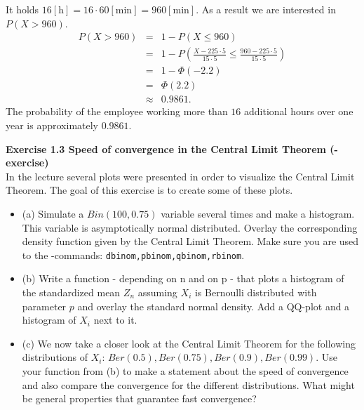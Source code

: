 \documentclass[11pt]{article}
\newcommand{\bi}{\begin{itemize}}
\newcommand{\ei}{\end{itemize}}
\newenvironment{loesung}{}{}          %
\begin{document}
\begin{enumerate}
\begin{loesung}\vspace{0.2cm}
It holds $16 [\text{h}] = 16 \cdot 60 [\text{min}] = 960 [\text{min}]$. As a result we are interested in $P(X > 960)$. 
\begin{eqnarray*}
  P(X > 960) &=& 1 - P(X \leq 960)\\
             &=& 1 - P\left(\frac{X - 225 \cdot 5}{15 \cdot 5} \leq \frac{960 - 225 \cdot 5}{15 \cdot 5} \right) \\
             &=& 1 - \Phi (-2.2) \\
             &=& \Phi (2.2) \\
             &\approx& 0.9861.
\end{eqnarray*}
The probability of the employee working more than $16$ additional hours over one year is approximately $0.9861$.

\end{loesung}
\end{enumerate}


{\bf Exercise 1.3 Speed of convergence in the Central Limit Theorem (\R-exercise)}\vspace{0.2cm}\\

In the lecture several plots were presented in order to visualize the Central Limit Theorem. The goal of this exercise is to create some of these plots.

\bi
\item[(a)] Simulate a $Bin(100,0.75)$ variable several times and make a histogram. This variable is asymptotically normal distributed. Overlay the corresponding density function given by the Central Limit Theorem. Make sure you are used to the \R-commands: \texttt{dbinom,pbinom,qbinom,rbinom}.

\item[(b)] Write a function - depending on n and on p - that plots a histogram of the standardized mean $Z_n$ assuming $X_i$ is Bernoulli distributed with parameter $p$ and overlay the standard normal density. Add a QQ-plot and a histogram of $X_i$ next to it.

\item[(c)] We now take a closer look at the Central Limit Theorem for the following distributions of $X_i$: $Ber(0.5),Ber(0.75),Ber(0.9),Ber(0.99)$. Use your function from (b) to make a statement about the speed of convergence and also compare the convergence for the different distributions. What might be general properties that guarantee fast convergence?
\ei
\end{document}
